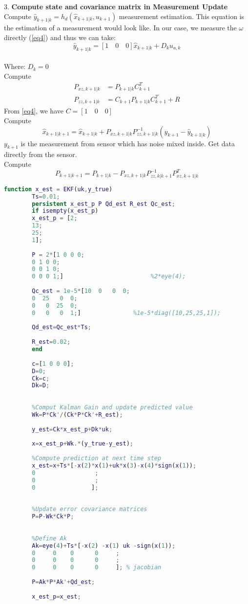 \documentclass[12pt,a4paper]{article}
\begin{document}
	3. \textbf{Compute state and covariance matrix in Measurement Update}\\
	Compute \(\hat{y}_{k+1|k} = h_d(\hat{x}_{k+1|k},u_{k+1})\) measurement estimation. This equation is the estimation of a measurement would look like. In our case, we measure the $\omega$ directly (\autoref{eq4}) and thus we can take:
	\[\hat{y}_{k+1|k} = [1\quad 0\quad 0]\hat{x}_{k+1|k} + D_ku_{a,k}\]
	\\
	Where: \(D_k = 0\)
	\\
	Compute \[
	\begin{split}
		P_{xz,k+1|k} &= P_{k+1|k}C^T_{k+1}\\
		P_{zz,k+1|k} &= C_{k+1}P_{k+1|k}C^T_{k+1}+R
	\end{split}\]
	From \autoref{eq4}, we have \(C = [1\quad 0\quad 0]\)
	\\
	Compute
	\[\hat{x}_{k+1|k+1} = \hat{x}_{k+1|k} + P_{xz,k+1|k}P^{-1}_{zz,k+1|k}(y_{k+1}-\hat{y}_{k+1|k})\]
	\(y_{k+1}\) is the measurement from sensor which has noise mixed inside. Get data directly from the sensor.
	\\
	Compute
	\[P_{k+1|k+1} = P_{k+1|k} - P_{xz,k+1|k}P^{-1}_{zz,k|k+1}P^T_{xz,k+1|k}\]
	
	\begin{lstlisting}[language=MATLAB]
		function x_est = EKF(uk,y_true)
		Ts=0.01;
		persistent x_est_p P Qd_est R_est Qc_est;
		if isempty(x_est_p)
		x_est_p = [2;
		13;
		25;
		1];
		
		P = 2*[1 0 0 0;
		0 1 0 0;
		0 0 1 0;
		0 0 0 1;]                         %2*eye(4);
		
		Qc_est = 1e-5*[10  0   0  0;
		0  25   0  0;
		0   0  25  0;
		0   0   0  1;]               %1e-5*diag([10,25,25,1]);
		
		Qd_est=Qc_est*Ts;
		
		R_est=0.02;
		end
		
		c=[1 0 0 0];
		D=0;
		Ck=c;
		Dk=D;
		
		
		%Comput Kalman Gain and update predicted value
		Wk=P*Ck'/(Ck*P*Ck'+R_est);
		
		y_est=Ck*x_est_p+Dk*uk;
		
		x=x_est_p+Wk.*(y_true-y_est);
		
		%Compute prediction at next time step
		x_est=x+Ts*[-x(2)*x(1)+uk*x(3)-x(4)*sign(x(1));
		0                 ;
		0                 ;
		0                ];
		
		
		%Update error covariance matrices
		P=P-Wk*Ck*P;
		
		
		%Define Ak
		Ak=eye(4)+Ts*[-x(2) -x(1) uk -sign(x(1));
		0     0    0      0     ;
		0     0    0      0     ;
		0     0    0      0     ]; % jacobian
		
		P=Ak*P*Ak'+Qd_est;
		
		x_est_p=x_est;
	\end{lstlisting}
\end{document}
